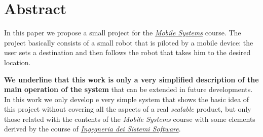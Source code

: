 \section*{Abstract}

In this paper we propose a small project for the \textit{\href{https://www.unibo.it/it/didattica/insegnamenti/insegnamento/2021/402283}{Mobile Systems}} course.
The project basically consists of a small robot that is piloted by a mobile device: the user sets a destination and then follows the robot that takes him to the desired location.

\textbf{We underline that this work is only a very simplified description of the main operation of the system} that can be extended in future developments.
In this work we only develop e very simple system that shows the basic idea of this project without covering all the aspects of a real \textit{sealable} product, but only those related with the contents of the \textit{Mobile Systems} course with some elements derived by the course of \href{https://www.unibo.it/it/didattica/insegnamenti/insegnamento/2021/468003}{\textit{Ingegneria dei Sistemi Software}}.

